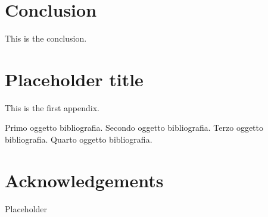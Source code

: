 \documentclass[12pt,a4paper,openright,twoside]{report}
\begin{document}


\chapter*{Conclusion}




This is the conclusion.







\appendix
\chapter{Placeholder title}
               



This is the first appendix.





\begin{thebibliography}{90}
  \rhead[\fancyplain{}{\bfseries \leftmark}]{\fancyplain{}{\bfseries \thepage}}

   Primo oggetto bibliografia.
   Secondo oggetto bibliografia.
   Terzo oggetto bibliografia.
   Quarto oggetto bibliografia.
\end{thebibliography}





\chapter*{Acknowledgements}

\thispagestyle{empty}

  Placeholder 
\end{document}
